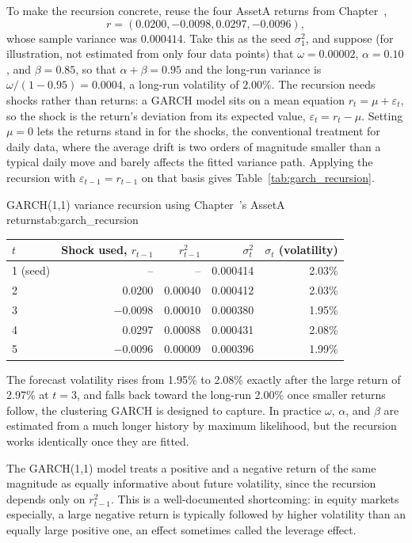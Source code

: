 \documentclass[../ai_in_finance]{subfiles}
\begin{document}
To make the recursion concrete, reuse the four AssetA returns from Chapter~,
$$r = (0.0200, -0.0098, 0.0297, -0.0096),$$
whose sample variance was $0.000414$. Take this as the seed $\sigma_1^2$, and suppose (for illustration, not estimated from only four data points) that $\omega = 0.00002$, $\alpha = 0.10$, and $\beta = 0.85$, so that $\alpha+\beta = 0.95$ and the long-run variance is $\omega/(1-0.95) = 0.0004$, a long-run volatility of $2.00\%$. The recursion needs shocks rather than returns: a GARCH model sits on a mean equation $r_t = \mu + \varepsilon_t$, so the shock is the return's deviation from its expected value, $\varepsilon_t = r_t - \mu$. Setting $\mu = 0$ lets the returns stand in for the shocks, the conventional treatment for daily data, where the average drift is two orders of magnitude smaller than a typical daily move and barely affects the fitted variance path. Applying the recursion with $\varepsilon_{t-1} = r_{t-1}$ on that basis gives Table~\ref{tab:garch_recursion}.

\begin{booktable}[htbp]{GARCH(1,1) variance recursion using Chapter~'s AssetA returns}{tab:garch_recursion}
\begin{tabular}{lrrrr}
\toprule
$t$ & Shock used, $r_{t-1}$ & $r_{t-1}^2$ & $\sigma_t^2$ & $\sigma_t$ (volatility) \\
\midrule
1 (seed) & --      & --      & 0.000414  & 2.03\% \\
2        & 0.0200  & 0.00040 & 0.000412  & 2.03\% \\
3        & $-0.0098$ & 0.00010 & 0.000380 & 1.95\% \\
4        & 0.0297  & 0.00088 & 0.000431  & 2.08\% \\
5        & $-0.0096$ & 0.00009 & 0.000396 & 1.99\% \\
\bottomrule
\end{tabular}
\end{booktable}

The forecast volatility rises from 1.95\% to 2.08\% exactly after the large return of 2.97\% at $t=3$, and falls back toward the long-run 2.00\% once smaller returns follow, the clustering GARCH is designed to capture. In practice $\omega$, $\alpha$, and $\beta$ are estimated from a much longer history by maximum likelihood, but the recursion works identically once they are fitted.

The GARCH(1,1) model treats a positive and a negative return of the same magnitude as equally informative about future volatility, since the recursion depends only on $r_{t-1}^2$. This is a well-documented shortcoming: in equity markets especially, a large negative return is typically followed by higher volatility than an equally large positive one, an effect sometimes called the leverage effect.
\end{document}
